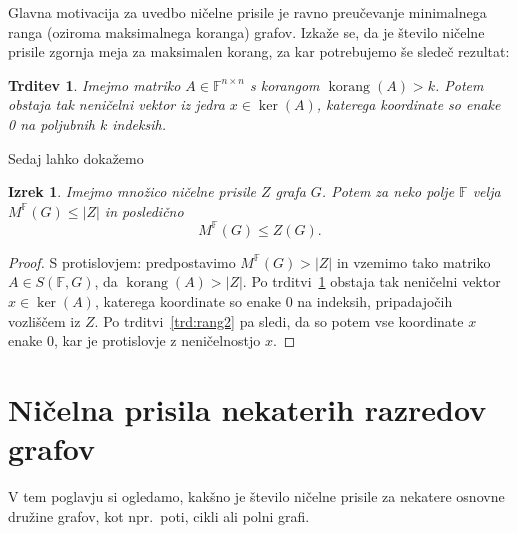\documentclass[12pt,a4paper,twoside]{article}
\theoremstyle{definition} %
\theoremstyle{plain} %
\newtheorem{izrek}[definicija]{Izrek}
\newtheorem{trditev}[definicija]{Trditev}
\numberwithin{equation}{section}  %
\newcommand{\F}{\mathbb F}
\DeclareMathOperator{\korang}{korang}
\begin{document}
Glavna motivacija za uvedbo ničelne prisile je ravno preučevanje minimalnega ranga (oziroma maksimalnega koranga) grafov. Izkaže se, da je število ničelne prisile zgornja meja za maksimalen korang, za kar potrebujemo še sledeč rezultat:
\begin{trditev}{{\cite[trditev 2.2]{aim2008minimumrank}}}
    \label{trd:rang1}
    Imejmo matriko $A \in \F^{n \times n}$ s korangom $\korang(A) > k$. Potem obstaja tak neničelni vektor iz jedra $x \in \ker(A)$, katerega koordinate so enake 0 na poljubnih $k$ indeksih.
\end{trditev}

Sedaj lahko dokažemo
\begin{izrek}{{\cite[trditev 2.4]{aim2008minimumrank}}}
    Imejmo množico ničelne prisile $Z$ grafa $G$. Potem za neko polje $\F$ velja $M^\F(G)  \leq |Z|$ in posledično
    \begin{equation}
        \label{eq:zf-korang}
        M^\F(G) \leq Z(G).
    \end{equation}
\end{izrek}
\begin{proof}
    S protislovjem: predpostavimo $M^\F(G) > |Z|$ in vzemimo tako matriko $A \in S(\F, G)$, da $\korang(A) > |Z|$. Po trditvi~\ref{trd:rang1} obstaja tak neničelni vektor $x \in \ker(A)$, katerega koordinate so enake 0 na indeksih, pripadajočih vozliščem iz $Z$. Po trditvi~\ref{trd:rang2} pa sledi, da so potem vse koordinate $x$ enake 0, kar je protislovje z neničelnostjo $x$.
\end{proof}

\section{Ničelna prisila nekaterih razredov grafov}
\label{sec:osnovni-rezultati}

V tem poglavju si ogledamo, kakšno je število ničelne prisile za nekatere osnovne družine grafov, kot npr.~poti, cikli ali polni grafi.
\end{document}

